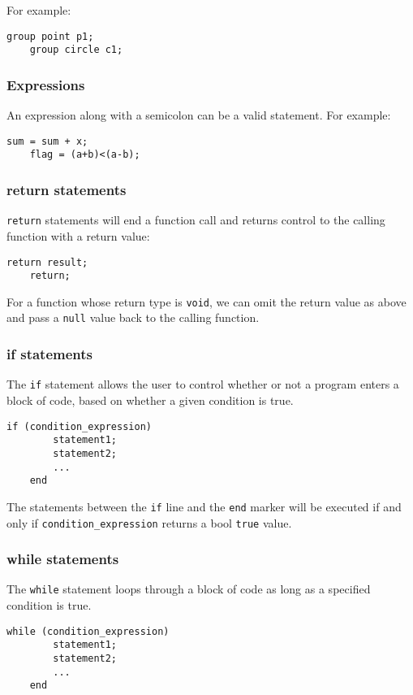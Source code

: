 \documentclass[11pt,letterpaper]{article}
\begin{document}
For example:
\begin{lstlisting}[tabsize=4]
	group point p1;
	group circle c1;
\end{lstlisting}

\subsubsection {Expressions}
An expression along with a semicolon can be a valid statement. For example:
\begin{lstlisting}[tabsize=4]
	sum = sum + x;
	flag = (a+b)<(a-b);
\end{lstlisting}

\subsubsection {return statements}
\texttt{return} statements will end a function call and returns control to the calling function with a return value:
\begin{lstlisting}[tabsize=4]
	return result;
	return;
\end{lstlisting}

For a function whose return type is \texttt{void}, we can omit the return value as above and pass a \texttt{null} value back to the calling function.

\subsubsection {if statements}
The \texttt{if} statement allows the user to control whether or not a program enters a block of code, based on whether a given condition is true. 

\begin{lstlisting}[tabsize=4]
	if (condition_expression)
   		statement1;
   		statement2;
		...
	end
\end{lstlisting}

The statements between the \texttt{if} line and the \texttt{end} marker will be executed if and only if \texttt{condition\_expression} returns a bool \texttt{true} value.

\subsubsection {while statements}
The \texttt{while} statement loops through a block of code as long as a specified condition is true.

\begin{lstlisting}[tabsize=4]
	while (condition_expression)
   		statement1;
	   	statement2;
		...
	end
\end{lstlisting}
\end{document}
